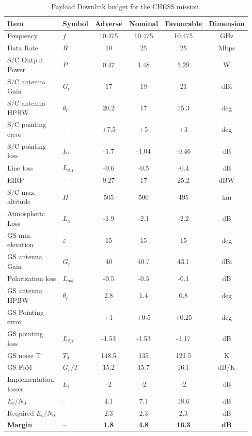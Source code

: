 \begin{table}[htbp]
    \centering
    \caption{Payload Downlink budget for the \textsf{CHESS} mission.}
    \label{tab:xband_downlink_budget}
    \begin{tabular}{llcccc}
        \toprule
        \textbf{Item} & \textbf{Symbol} & \textbf{Adverse} & \textbf{Nominal} & \textbf{Favourable} & \textbf{Dimension} \\
        \midrule
        Frequency & $f$ & 10.475 & 10.475 & 10.475 & GHz \\
        Data Rate & $R$ & 10 & 25 & 25 & Mbps \\
        S/C Output Power & $P$ & 0.47 & 1.48 & 5.29 & W \\
        S/C antenna Gain & $G_t$ & 17 & 19 & 21 & dBi \\
        S/C antenna HPBW & $\theta_t$ & 20.2 & 17 & 15.3 & deg \\
        S/C pointing error & -- & $\pm 7.5$ & $\pm 5$ & $\pm 3$ & deg \\
        S/C pointing loss & $L_t$ & -1.7 & -1.04 & -0.46 & dB \\
        Line loss & $L_{\theta,t}$ & -0.6 & -0.5 & -0.4 & dB \\
        EIRP & -- & 9.27 & 17 & 25.2 & dBW \\
        S/C max. altitude & $H$ & 505 & 500 & 495 & km \\
        Atmospheric Loss & $L_a$ & -1.9 & -2.1 & -2.2 & dB \\
        GS min. elevation & $\varepsilon$ & 15 & 15 & 15 & deg \\
        GS antenna Gain & $G_r$ & 40 & 40.7 & 43.1 & dBi \\
        Polarization loss & $L_{pol}$ & -0.5 & -0.3 & -0.1 & dB \\
        GS antenna HPBW & $\theta_r$ & 2.8 & 1.4 & 0.8 & deg \\
        GS Pointing error & -- & $\pm 1$ & $\pm 0.5$ & $\pm 0.25$ & deg \\
        GS pointing loss & $L_{\theta,r}$ & -1.53 & -1.53 & -1.17 & dB \\
        GS noise T$^\circ$ & $T_0$ & 148.5 & 135 & 121.5 & K \\
        GS FoM & $G_r/T$ & 15.2 & 15.7 & 16.1 & dB/K \\
        Implementation losses & $L_i$ & -2 & -2 & -2 & dB \\
        $E_b/N_0$ & -- & 4.1 & 7.1 & 18.6 & dB \\
        Required $E_b/N_0$ & -- & 2.3 & 2.3 & 2.3 & dB \\
        \midrule
        \textbf{Margin} & -- & \textbf{1.8} & \textbf{4.8} & \textbf{16.3} & \textbf{dB} \\
        \bottomrule
    \end{tabular}
\end{table}

